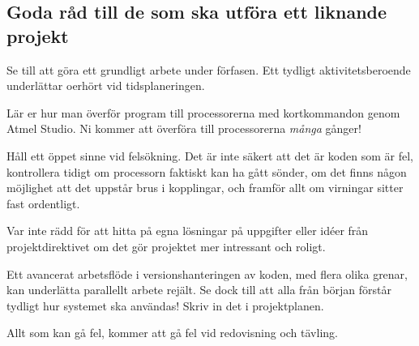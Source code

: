 \documentclass[a4paper,12pt]{article}
\begin{document}
\subsection{Goda råd till de som ska utföra ett liknande projekt}
Se till att göra ett grundligt arbete under förfasen. Ett tydligt aktivitetsberoende underlättar oerhört vid tidsplaneringen. 

Lär er hur man överför program till processorerna med kortkommandon genom Atmel Studio. Ni kommer att överföra till processorerna \emph{många} gånger!

Håll ett öppet sinne vid felsökning. Det är inte säkert att det är koden som är fel, kontrollera tidigt om processorn faktiskt kan ha gått sönder, om det finns någon möjlighet att det uppstår brus i kopplingar, och framför allt om virningar sitter fast ordentligt. 

Var inte rädd för att hitta på egna lösningar på uppgifter eller idéer från projektdirektivet om det gör projektet mer intressant och roligt.

Ett avancerat arbetsflöde i versionshanteringen av koden, med flera olika grenar, kan underlätta parallellt arbete rejält. Se dock till att alla från början förstår tydligt hur systemet ska användas! Skriv in det i projektplanen.

Allt som kan gå fel, kommer att gå fel vid redovisning och tävling. 
\end{document}
